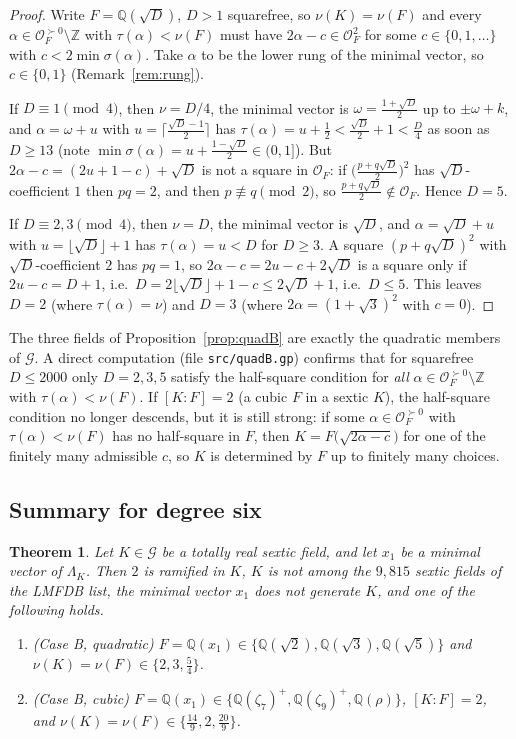 \documentclass[11pt,reqno]{amsart}
\theoremstyle{plain}
\newtheorem{theorem}{Theorem}[section]
\theoremstyle{definition}
\newcommand{\Z}{\mathbb{Z}}
\newcommand{\Q}{\mathbb{Q}}
\newcommand{\OF}{\mathcal{O}_F}
\newcommand{\Gcl}{\mathcal{G}}
\newcommand{\tp}{\succ 0}
\begin{document}
\begin{proof}
Write $F=\Q(\sqrt D)$, $D>1$ squarefree, so $\nu(K)=\nu(F)$ and every $\alpha\in\OF^{\tp}\setminus\Z$
with $\tau(\alpha)<\nu(F)$ must have $2\alpha-c\in\OF^{2}$ for some $c\in\{0,1,\dots\}$ with
$c<2\min\sigma(\alpha)$. Take $\alpha$ to be the lower rung of the minimal vector, so $c\in\{0,1\}$
(Remark~\ref{rem:rung}).

If $D\equiv1\pmod4$, then $\nu=D/4$, the minimal vector is $\omega=\frac{1+\sqrt D}2$ up to
$\pm\omega+k$, and $\alpha=\omega+u$ with $u=\lceil\frac{\sqrt D-1}2\rceil$ has
$\tau(\alpha)=u+\frac12<\frac{\sqrt D}2+1<\frac D4$ as soon as $D\ge13$ (note $\min\sigma(\alpha)=u+\frac{1-\sqrt D}2\in(0,1]$). But
$2\alpha-c=(2u+1-c)+\sqrt D$ is not a square in $\OF$: if $\bigl(\frac{p+q\sqrt D}2\bigr)^{2}$ has
$\sqrt D$-coefficient $1$ then $pq=2$, and then $p\not\equiv q\pmod 2$, so $\frac{p+q\sqrt D}2\notin\OF$.
Hence $D=5$.

If $D\equiv2,3\pmod4$, then $\nu=D$, the minimal vector is $\sqrt D$, and $\alpha=\sqrt D+u$ with
$u=\lfloor\sqrt D\rfloor+1$ has $\tau(\alpha)=u<D$ for $D\ge3$. A square $(p+q\sqrt D)^{2}$ with
$\sqrt D$-coefficient $2$ has $pq=1$, so $2\alpha-c=2u-c+2\sqrt D$ is a square only if
$2u-c=D+1$, i.e.\ $D=2\lfloor\sqrt D\rfloor+1-c\le2\sqrt D+1$, i.e.\ $D\le5$. This leaves $D=2$
(where $\tau(\alpha)=\nu$) and $D=3$ (where $2\alpha=(1+\sqrt3)^{2}$ with $c=0$).
\end{proof}

The three fields of Proposition~\ref{prop:quadB} are exactly the quadratic members of $\Gcl$. A
direct computation (file \texttt{src/quadB.gp}) confirms that for squarefree $D\le2000$ only
$D=2,3,5$ satisfy the half-square condition for \emph{all} $\alpha\in\OF^{\tp}\setminus\Z$ with
$\tau(\alpha)<\nu(F)$. If $[K:F]=2$ (a cubic $F$ in a sextic $K$), the half-square condition no longer
descends, but it is still strong: if some $\alpha\in\OF^{\tp}$ with $\tau(\alpha)<\nu(F)$ has no
half-square in $F$, then $K=F\bigl(\sqrt{2\alpha-c}\bigr)$ for one of the finitely many admissible
$c$, so $K$ is determined by $F$ up to finitely many choices.



\subsection{Summary for degree six}
\begin{theorem}\label{thm:sextic}
Let $K\in\Gcl$ be a totally real sextic field, and let $x_1$ be a minimal vector of $\Lambda_K$.
Then $2$ is ramified in $K$, $K$ is not among the $9{,}815$ sextic fields of the LMFDB list, the
minimal vector $x_1$ does \emph{not} generate $K$, and one of the following holds.
\begin{enumerate}
\item \textup{(Case B, quadratic)} $F=\Q(x_1)\in\{\Q(\sqrt2),\Q(\sqrt3),\Q(\sqrt5)\}$ and
$\nu(K)=\nu(F)\in\{2,3,\frac54\}$.
\item \textup{(Case B, cubic)} $F=\Q(x_1)\in\{\Q(\zeta_7)^{+},\Q(\zeta_9)^{+},\Q(\rho)\}$, $[K:F]=2$, and
$\nu(K)=\nu(F)\in\{\frac{14}9,2,\frac{20}9\}$.
\end{enumerate}
\end{theorem}
\end{document}

